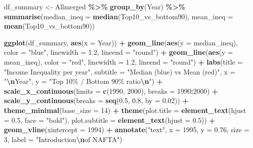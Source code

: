 \documentclass[
]{article}
\newenvironment{Shaded}{\begin{snugshade}}{\end{snugshade}}
\newcommand{\AttributeTok}[1]{\textcolor[rgb]{0.13,0.29,0.53}{#1}}
\newcommand{\DecValTok}[1]{\textcolor[rgb]{0.00,0.00,0.81}{#1}}
\newcommand{\FloatTok}[1]{\textcolor[rgb]{0.00,0.00,0.81}{#1}}
\newcommand{\FunctionTok}[1]{\textcolor[rgb]{0.13,0.29,0.53}{\textbf{#1}}}
\newcommand{\NormalTok}[1]{#1}
\newcommand{\OtherTok}[1]{\textcolor[rgb]{0.56,0.35,0.01}{#1}}
\newcommand{\SpecialCharTok}[1]{\textcolor[rgb]{0.81,0.36,0.00}{\textbf{#1}}}
\newcommand{\StringTok}[1]{\textcolor[rgb]{0.31,0.60,0.02}{#1}}
\begin{document}
\begin{Shaded}
\begin{Highlighting}[]
\NormalTok{df\_summary }\OtherTok{\textless{}{-}}\NormalTok{ Allmerged }\SpecialCharTok{\%\textgreater{}\%}
  \FunctionTok{group\_by}\NormalTok{(Year) }\SpecialCharTok{\%\textgreater{}\%}
  \FunctionTok{summarise}\NormalTok{(}\AttributeTok{median\_ineq =} \FunctionTok{median}\NormalTok{(Top10\_vs\_bottom90),}
            \AttributeTok{mean\_ineq =} \FunctionTok{mean}\NormalTok{(Top10\_vs\_bottom90))}

\FunctionTok{ggplot}\NormalTok{(df\_summary, }\FunctionTok{aes}\NormalTok{(}\AttributeTok{x =}\NormalTok{ Year)) }\SpecialCharTok{+}
  \FunctionTok{geom\_line}\NormalTok{(}\FunctionTok{aes}\NormalTok{(}\AttributeTok{y =}\NormalTok{ median\_ineq), }\AttributeTok{color =} \StringTok{"blue"}\NormalTok{, }
            \AttributeTok{linewidth =} \FloatTok{1.2}\NormalTok{, }
            \AttributeTok{lineend =} \StringTok{"round"}\NormalTok{) }\SpecialCharTok{+}
  \FunctionTok{geom\_line}\NormalTok{(}\FunctionTok{aes}\NormalTok{(}\AttributeTok{y =}\NormalTok{ mean\_ineq), }
            \AttributeTok{color =} \StringTok{"red"}\NormalTok{,}
            \AttributeTok{linewidth =} \FloatTok{1.2}\NormalTok{,}
            \AttributeTok{lineend =} \StringTok{"round"}\NormalTok{) }\SpecialCharTok{+}
  \FunctionTok{labs}\NormalTok{(}\AttributeTok{title =} \StringTok{"Income Inequality per year"}\NormalTok{, }
       \AttributeTok{subtitle =} \StringTok{"Median (blue) vs Mean (red)"}\NormalTok{,}
       \AttributeTok{x =} \StringTok{"}\SpecialCharTok{\textbackslash{}n}\StringTok{Year"}\NormalTok{, }
       \AttributeTok{y =} \StringTok{"Top 10\% / Bottom 90\% ratio}\SpecialCharTok{\textbackslash{}n}\StringTok{"}\NormalTok{) }\SpecialCharTok{+}
  \FunctionTok{scale\_x\_continuous}\NormalTok{(}\AttributeTok{limits =} \FunctionTok{c}\NormalTok{(}\DecValTok{1990}\NormalTok{, }\DecValTok{2000}\NormalTok{), }\AttributeTok{breaks =} \DecValTok{1990}\SpecialCharTok{:}\DecValTok{2000}\NormalTok{) }\SpecialCharTok{+}
  \FunctionTok{scale\_y\_continuous}\NormalTok{(}\AttributeTok{breaks =} \FunctionTok{seq}\NormalTok{(}\FloatTok{0.5}\NormalTok{, }\FloatTok{0.8}\NormalTok{, }\AttributeTok{by =} \FloatTok{0.02}\NormalTok{)) }\SpecialCharTok{+}
  \FunctionTok{theme\_minimal}\NormalTok{(}\AttributeTok{base\_size =} \DecValTok{14}\NormalTok{) }\SpecialCharTok{+}
  \FunctionTok{theme}\NormalTok{(}\AttributeTok{plot.title =} \FunctionTok{element\_text}\NormalTok{(}\AttributeTok{hjust =} \FloatTok{0.5}\NormalTok{, }\AttributeTok{face =} \StringTok{"bold"}\NormalTok{),}
    \AttributeTok{plot.subtitle =} \FunctionTok{element\_text}\NormalTok{(}\AttributeTok{hjust =} \FloatTok{0.5}\NormalTok{)) }\SpecialCharTok{+}
  \FunctionTok{geom\_vline}\NormalTok{(}\AttributeTok{xintercept =} \DecValTok{1994}\NormalTok{) }\SpecialCharTok{+}
  \FunctionTok{annotate}\NormalTok{(}\StringTok{"text"}\NormalTok{, }\AttributeTok{x =} \DecValTok{1995}\NormalTok{, }\AttributeTok{y =} \FloatTok{0.76}\NormalTok{, }\AttributeTok{size =} \DecValTok{3}\NormalTok{, }\AttributeTok{label =} \StringTok{"Introduction}\SpecialCharTok{\textbackslash{}n}\StringTok{of NAFTA"}\NormalTok{)}
\end{Highlighting}
\end{Shaded}
\end{document}
